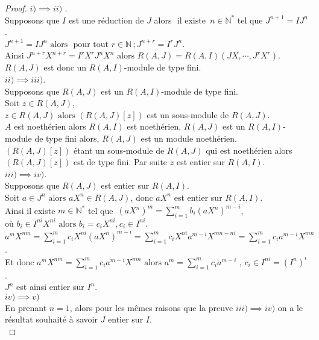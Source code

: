 \begin{proof}
	$i) \implies ii)$ .\\
	Supposons que $I$ est une réduction de $J$ alors $\text{ il existe } \, n \in \mathbb{N}^{*}$ tel que $J^{n+1} = IJ^{n}$.\\
	$J^{n+1} = IJ^{n} \text{ alors } \text{ pour tout } r \in \mathbb{N} \, ; J^{n+r} = I^rJ^{n}$.\\
	Ainsi $J^{n+r} X^{n+r} = I^r X^rJ^{n} X^n \text{ alors } R(A,J) = R(A,I)(JX, \cdots ,J^rX^r)$.\\
	$R(A,J)$ est donc un $R(A,I)$-module de type fini.\\
	$ii) \implies iii)$.\\
	Supposons que $R(A,J)$ est un $R(A,I)$-module de type fini.\\
	Soit $z \in R(A,J)$,\\
	$z \in R(A,J) \text{ alors } (R(A,J)[z])$ est un sous-module de $R(A,J)$.\\
	$A$ est noethérien alors $R(A,I)$ est noethérien, $R(A,J)$ est un $R(A,I)$-module de type fini alors, $R(A,J)$ est un module noethérien.\\
	$(R(A,J)[z])$ étant un sous-module de $R(A,J)$ qui est noethérien alors $(R(A,J)[z])$ est de type fini. Par suite $z$ est entier sur $R(A,I)$.\\
	$iii) \implies iv)$.\\
	Supposons que $R(A,J)$ est entier sur $R(A,I)$.\\
	Soit $a \in J^n \text{ alors } aX^n \in R(A,J)$, donc $aX^n$ est entier sur $R(A,I)$.\\
	Ainsi il existe $m \in \mathbb{N^*}$  tel que  $\, (aX^n)^m = \displaystyle \sum_{i=1}^{m}{b_i (aX^n)^{m-i}}$,\\ où $b_i \in I^{ni} X^{ni} \text{ alors } b_i = c_i X^{ni} , c_i \in I^{ni}$.\\
	$a^m X^{nm} = \displaystyle \sum_{i=1}^{m}{c_i X^{ni} (aX^n)^{m-i}} = \displaystyle \sum_{i=1}^{m}{c_i X^{ni} a^{m-i} X^{mn-ni}} = \displaystyle \sum_{i=1}^{m}{c_i a^{m-i} X^{mn}}$.\\
	Et donc $a^m X^{nm} = \displaystyle \sum_{i=1}^{m}{c_i a^{m-i} X^{mn}} \text{ alors } a^m = \displaystyle \sum_{i=1}^{m}{c_i a^{m-i}}$ , $c_i \in I^{ni} = (I^n)^i$.\\
	$J^n$ est ainsi entier sur $I^n$.\\
	$iv) \implies v)$\\
	En prenant $n = 1$, alors pour les mêmes raisons que la preuve $iii) \implies iv)$ on a le résultat souhaité à savoir $J$ entier sur $I$.\\

\end{proof}
